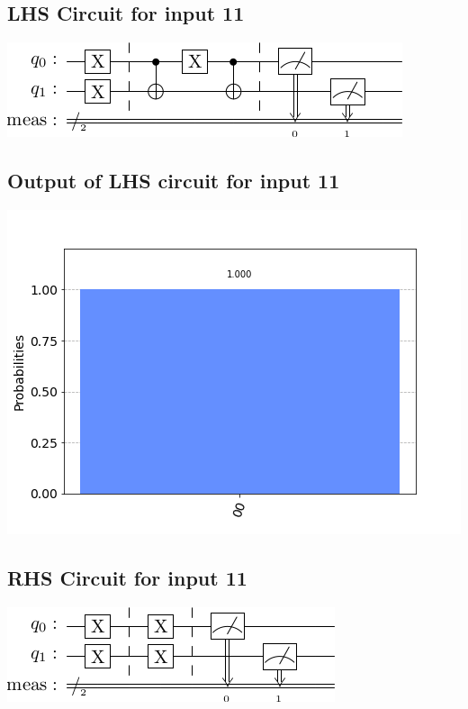\documentclass[a4paper]{article}
\begin{document}
\begin{answer}[Question 1 b (a)]
        \subsection*{LHS Circuit for input 11}
        \includegraphics[scale=0.5]{a111.png}
        \subsection*{Output of LHS circuit for input 11}
        \includegraphics[scale = 0.5]{a111-out.png}
        \subsection*{RHS Circuit for input 11}
        \includegraphics[scale=0.5]{a211.png}

\end{answer}
\end{document}
